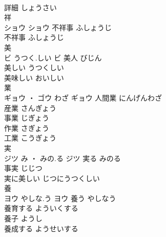 \documentclass[8pt]{extreport}
\begin{document}
\begin{CJK}{UTF8}{min}
\\	詳細	しょうさい	
\\	祥	
\\	ショウ		ショウ	不祥事	ふしょうじ	
\\	不祥事	ふしょうじ	
\\	美	
\\	ビ	うつく.しい	ビ	美人	びじん	
\\	美しい	うつくしい	
\\	美味しい	おいしい	
\\	業	
\\	ギョウ ・ ゴウ	わざ	ギョウ	人間業	にんげんわざ	
\\	産業	さんぎょう	
\\	事業	じぎょう	
\\	作業	さぎょう	
\\	工業	こうぎょう	
\\	実	
\\	ジツ	み ・ みの.る	ジツ	実る	みのる	
\\	事実	じじつ	
\\	実に美しい	じつにうつくしい	
\\	養	
\\	ヨウ	やしな.う	ヨウ	養う	やしなう	
\\	養育する	よういくする	
\\	養子	ようし	
\\	養成する	ようせいする	
\end{CJK}
\end{document}
